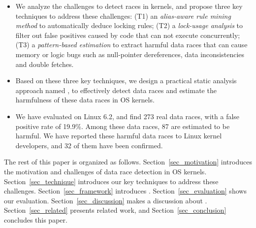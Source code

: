 \begin{itemize}
	\item We analyze the challenges to detect races in kernels, and propose 
	three key techniques to address	these challenges: (T1) an {\em alias-aware 
	rule mining method} to automatically deduce locking rules; (T2) a {\em 
	lock-usage analysis} to filter out false positives caused by code that can 
	not execute concurrently; (T3) a {\em pattern-based estimation} to extract 
	harmful data races that can cause memory or logic bugs such as null-pointer 
	dereferences, data inconsistencies and double fetches.		
	\item Based on these three key techniques, we design a practical static 	
	analysis approach named \sys, to effectively detect data races and 	
	estimate the harmfulness of these data races in OS kernels.
	\item We have evaluated \sys on Linux 6.2, and find 273 real data races, 	
	with a false positive rate of 19.9\%. Among these data races, 87 are 
	estimated to be harmful. We have reported these harmful data races to Linux 
	kernel developers, and 32 of them have been confirmed.
\end{itemize}

The rest of this paper is organized as follows. Section~\ref{sec_motivation} 
introduces the motivation and challenges of data race detection in OS kernels. 
Section~\ref{sec_technique} introduces our key techniques to address these 
challenges. Section~\ref{sec_framework} introduces \sys. 
Section~\ref{sec_evaluation} shows our evaluation. Section~\ref{sec_discussion} 
makes a discussion about \sys. Section~\ref{sec_related} presents related 
work, and Section~\ref{sec_conclusion} concludes this paper.
